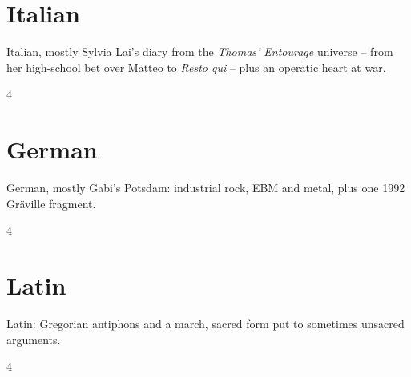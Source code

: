 \documentclass[a4paper,landscape]{memoir}
\begin{document}
\chapter{Italian}
Italian, mostly Sylvia Lai's diary from the \emph{Thomas' Entourage} universe -- from her high-school bet over Matteo to \emph{Resto qui} -- plus an operatic heart at war.
\clearpage\begin{multicols*}{4}
\end{multicols*}

\chapter{German}
German, mostly Gabi's Potsdam: industrial rock, EBM and metal, plus one 1992 Gräville fragment.
\clearpage\begin{multicols*}{4}
\end{multicols*}

\chapter{Latin}
Latin: Gregorian antiphons and a march, sacred form put to sometimes unsacred arguments.
\clearpage\begin{multicols*}{4}
\end{multicols*}
\end{document}
